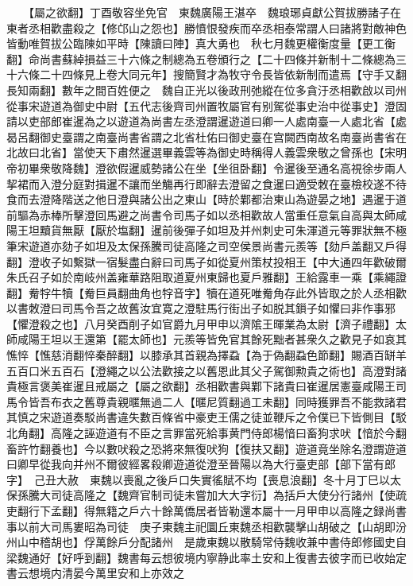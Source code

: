 　　【屬之欲翻】丁酉敬容坐免官　東魏廣陽王湛卒　魏琅琊貞獻公賀拔勝諸子在東者丞相歡盡殺之【修邙山之怨也】勝憤恨發疾而卒丞相泰常謂人曰諸將對敵神色皆動唯賀拔公臨陳如平時【陳讀曰陣】真大勇也　秋七月魏更權衡度量【更工衡翻】命尚書蘇綽損益三十六條之制總為五卷頒行之【二十四條并新制十二條總為三十六條二十四條見上卷大同元年】搜簡賢才為牧守令長皆依新制而遣焉【守手又翻長知兩翻】數年之間百姓便之　魏自正光以後政刑弛縱在位多貪汙丞相歡啟以司州從事宋遊道為御史中尉【五代志後齊司州置牧屬官有别駕從事史治中從事史】澄固請以吏部郎崔暹為之以遊道為尚書左丞澄謂暹遊道曰卿一人處南臺一人處北省【處曷呂翻御史臺謂之南臺尚書省謂之北省杜佑曰御史臺在宫闕西南故名南臺尚書省在北故曰北省】當使天下肅然暹選畢義雲等為御史時稱得人義雲衆敬之曾孫也【宋明帝初畢衆敬降魏】澄欲假暹威勢諸公在坐【坐徂卧翻】令暹後至通名高視徐步兩人挈裙而入澄分庭對揖暹不讓而坐觴再行即辭去澄留之食暹曰適受敇在臺檢校遂不待食而去澄降階送之他日澄與諸公出之東山【時於鄴都治東山為遊晏之地】遇暹于道前驅為赤棒所擊澄回馬避之尚書令司馬子如以丞相歡故人當重任意氣自高與太師咸陽王坦黷貨無厭【厭於塩翻】暹前後彈子如坦及并州刺史可朱渾道元等罪狀無不極筆宋遊道亦劾子如坦及太保孫騰司徒高隆之司空侯景尚書元羨等【劾戶盖翻又戶得翻】澄收子如繫獄一宿髮盡白辭曰司馬子如從夏州策杖投相王【中大通四年歡破爾朱氏召子如於南岐州盖雍華路阻取道夏州東歸也夏戶雅翻】王給露車一乘【乘繩證翻】觠牸牛犢【觠巨員翻曲角也牸音字】犢在道死唯觠角存此外皆取之於人丞相歡以書敇澄曰司馬令吾之故舊汝宜寛之澄駐馬行街出子如脱其鎻子如懼曰非作事邪【懼澄殺之也】八月癸酉削子如官爵九月甲申以濟隂王暉業為太尉【濟子禮翻】太師咸陽王坦以王還第【罷太師也】元羨等皆免官其餘死黜者甚衆久之歡見子如哀其憔悴【憔慈消翻悴秦醉翻】以膝承其首親為擇蝨【為于偽翻蝨色節翻】賜酒百缾羊五百口米五百石【澄繩之以公法歡接之以舊恩此其父子駕御勲貴之術也】高澄對諸貴極言褒美崔暹且戒屬之【屬之欲翻】丞相歡書與鄴下諸貴曰崔暹居憲臺咸陽王司馬令皆吾布衣之舊尊貴親暱無過二人【暱尼質翻過工未翻】同時獲罪吾不能救諸君其慎之宋遊道奏駁尚書違失數百條省中豪吏王儒之徒並鞭斥之令僕已下皆側目【駁北角翻】高隆之誣遊道有不臣之言罪當死給事黄門侍郎楊愔曰畜狗求吠【愔於今翻畜許竹翻養也】今以數吠殺之恐將來無復吠狗【復扶又翻】遊道竟坐除名澄謂遊道曰卿早從我向并州不爾彼經畧殺卿遊道從澄至晉陽以為大行臺吏部【部下當有郎字】　己丑大赦　東魏以喪亂之後戶口失實徭賦不均【喪息浪翻】冬十月丁巳以太保孫騰大司徒高隆之【魏齊官制司徒未嘗加大大字衍】為括戶大使分行諸州【使疏吏翻行下孟翻】得無籍之戶六十餘萬僑居者皆勒還本屬十一月甲申以高隆之録尚書事以前大司馬婁昭為司徒　庚子東魏主祀圜丘東魏丞相歡襲擊山胡破之【山胡即汾州山中稽胡也】俘萬餘戶分配諸州　是歲東魏以散騎常侍魏收兼中書侍郎修國史自梁魏通好【好呼到翻】魏書每云想彼境内寧静此率土安和上復書去彼字而已收始定書云想境内清晏今萬里安和上亦效之


